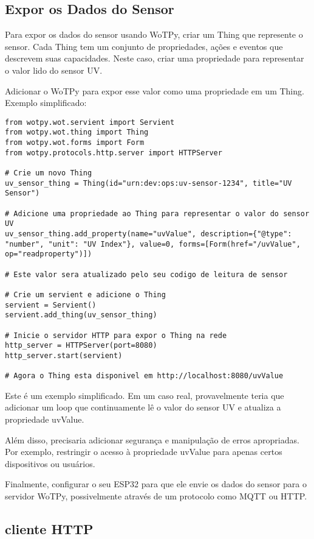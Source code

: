 \subsection{Expor os Dados do Sensor}

Para expor os dados do sensor usando WoTPy, criar um Thing que represente o sensor. Cada Thing tem um conjunto de propriedades, ações e eventos que descrevem suas capacidades. Neste caso, criar uma propriedade para representar o valor lido do sensor UV.

Adicionar o WoTPy para expor esse valor como uma propriedade em um Thing. Exemplo simplificado:
 
\begin{lstlisting}[breaklines]
from wotpy.wot.servient import Servient
from wotpy.wot.thing import Thing
from wotpy.wot.forms import Form
from wotpy.protocols.http.server import HTTPServer

# Crie um novo Thing
uv_sensor_thing = Thing(id="urn:dev:ops:uv-sensor-1234", title="UV Sensor")

# Adicione uma propriedade ao Thing para representar o valor do sensor UV
uv_sensor_thing.add_property(name="uvValue", description={"@type": "number", "unit": "UV Index"}, value=0, forms=[Form(href="/uvValue", op="readproperty")])

# Este valor sera atualizado pelo seu codigo de leitura de sensor

# Crie um servient e adicione o Thing
servient = Servient()
servient.add_thing(uv_sensor_thing)

# Inicie o servidor HTTP para expor o Thing na rede
http_server = HTTPServer(port=8080)
http_server.start(servient)

# Agora o Thing esta disponivel em http://localhost:8080/uvValue
\end{lstlisting}

Este é um exemplo simplificado. Em um caso real, provavelmente teria que adicionar um loop que continuamente lê o valor do sensor UV e atualiza a propriedade uvValue.

Além disso, precisaria adicionar segurança e manipulação de erros apropriadas. Por exemplo, restringir o acesso à propriedade uvValue para apenas certos dispositivos ou usuários.

Finalmente, configurar o seu ESP32 para que ele envie os dados do sensor para o servidor WoTPy, possivelmente através de um protocolo como MQTT ou HTTP.

\subsection{cliente HTTP}

